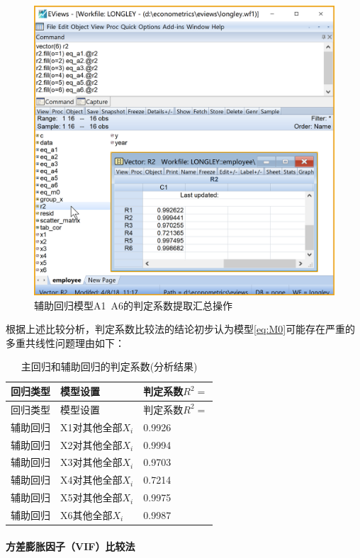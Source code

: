 \documentclass[12pt,(landscape,a4paper),(portrait,a4paper)]{article}
\let\oldparagraph\paragraph
\renewcommand{\paragraph}[1]{\oldparagraph{#1}\mbox{}}
\begin{document}
\begin{figure}

{\centering \includegraphics[width=8in]{picture/lab5-multilinearity/3-vector-R2} 

}

\caption{辅助回归模型A1~A6的判定系数提取汇总操作}\label{fig:fig-r2}
\end{figure}

根据上述比较分析，判定系数比较法的结论初步认为模型\eqref{eq:M0}可能存在严重的多重共线性问题理由如下：

\begin{longtable}[]{@{}lll@{}}
\caption{主回归和辅助回归的判定系数(分析结果) \label{tab:R2}}\tabularnewline
\toprule
回归类型 & 模型设置 & 判定系数\(R^2=\)\tabularnewline
\midrule
\endfirsthead
\toprule
回归类型 & 模型设置 & 判定系数\(R^2=\)\tabularnewline
\midrule
\endhead
辅助回归 & X1对其他全部\(X_i\) & 0.9926\tabularnewline
辅助回归 & X2对其他全部\(X_i\) & 0.9994\tabularnewline
辅助回归 & X3对其他全部\(X_i\) & 0.9703\tabularnewline
辅助回归 & X4对其他全部\(X_i\) & 0.7214\tabularnewline
辅助回归 & X5对其他全部\(X_i\) & 0.9975\tabularnewline
辅助回归 & X6其他全部\(X_i\) & 0.9987\tabularnewline
\bottomrule
\end{longtable}

\hypertarget{vif}{%
\paragraph{方差膨胀因子（VIF）比较法}\label{vif}}
\end{document}
